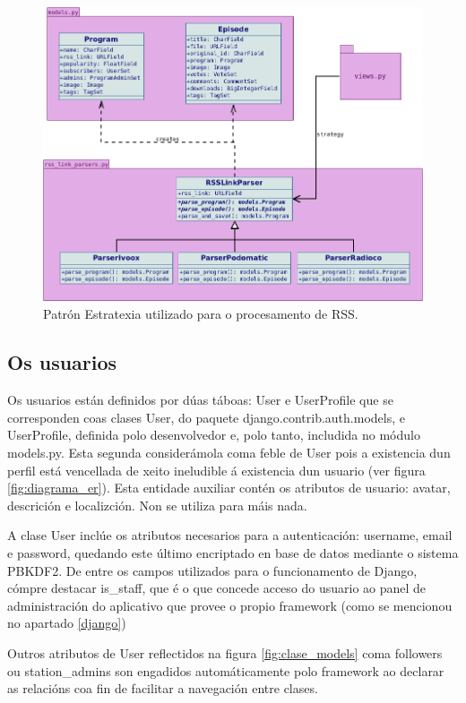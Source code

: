 \begin{figure}[h]
	\centering
	\includegraphics[scale=0.5,keepaspectratio=true]{./images/strategy.png}
	\caption{Patrón Estratexia utilizado para o procesamento de RSS.}
	\label{fig:strategy}
\end{figure}


\subsection{Os usuarios}

Os usuarios están definidos por dúas táboas: User e UserProfile que se corresponden coas clases User, do paquete django.contrib.auth.models, e UserProfile, definida polo desenvolvedor e, polo tanto, includida no módulo models.py. Esta segunda considerámola coma feble de User pois a existencia dun perfil está vencellada de xeito ineludible á existencia dun usuario (ver figura \ref{fig:diagrama_er}). Esta entidade auxiliar contén os atributos de usuario: avatar, descrición e localizción. Non se utiliza para máis nada.

A clase User inclúe os atributos necesarios para a autenticación: username, email e password, quedando este último encriptado en base de datos mediante o sistema PBKDF2. De entre os campos utilizados para o funcionamento de Django, cómpre destacar is\_staff, que é o que concede acceso do usuario ao panel de administración do aplicativo que provee o propio framework (como se mencionou no apartado \ref{django})

Outros atributos de User reflectidos na figura \ref{fig:clase_models} coma followers ou station\_admins son engadidos automáticamente polo framework ao declarar as relacións coa fin de facilitar a navegación entre clases.








